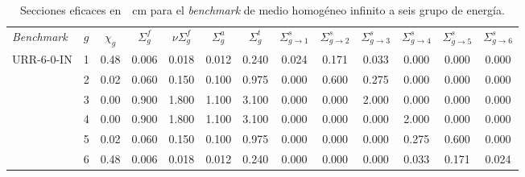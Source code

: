 \documentclass[11pt]{article}
\numberwithin{equation}{section}
\begin{document}
{
\begin{table}[h!]
\begin{center}
\begin{tabular}{lcccccccccccc}
\small \emph{Benchmark}  & \small $g$ & \small $\chi_g$ & \small $\Sigma^{f}_g$ & \small $\nu\Sigma^{f}_g$ & \small $\Sigma^{a}_g$ & \small $\Sigma^{t}_g$ & \small $\Sigma^s_{g \rightarrow 1}$ & \small $\Sigma^s_{g \rightarrow 2}$ & \small $\Sigma^s_{g \rightarrow 3}$ & \small $\Sigma^s_{g \rightarrow 4}$ & \small $\Sigma^s_{g \rightarrow 5}$ & \small $\Sigma^s_{g \rightarrow 6}$ \\
\small{URR-6-0-IN} & \tiny \num{1} & \tiny \num{0.48} & \tiny \num{0.006} & \tiny \num{0.018} & \tiny \num{0.012} & \tiny \num{0.240} & \tiny \num{0.024} & \tiny \num{0.171} & \tiny \num{0.033} & \tiny \num{0.000} & \tiny \num{0.000} & \tiny \num{0.000} \\
           & \tiny \num{2} & \tiny \num{0.02} & \tiny \num{0.060} & \tiny \num{0.150} & \tiny \num{0.100} & \tiny \num{0.975} & \tiny \num{0.000} & \tiny \num{0.600} & \tiny \num{0.275} & \tiny \num{0.000} & \tiny \num{0.000} & \tiny \num{0.000} \\
           & \tiny \num{3} & \tiny \num{0.00} & \tiny \num{0.900} & \tiny \num{1.800} & \tiny \num{1.100} & \tiny \num{3.100} & \tiny \num{0.000} & \tiny \num{0.000} & \tiny \num{2.000} & \tiny \num{0.000} & \tiny \num{0.000} & \tiny \num{0.000} \\
           & \tiny \num{4} & \tiny \num{0.00} & \tiny \num{0.900} & \tiny \num{1.800} & \tiny \num{1.100} & \tiny \num{3.100} & \tiny \num{0.000} & \tiny \num{0.000} & \tiny \num{0.000} & \tiny \num{2.000} & \tiny \num{0.000} & \tiny \num{0.000} \\
           & \tiny \num{5} & \tiny \num{0.02} & \tiny \num{0.060} & \tiny \num{0.150} & \tiny \num{0.100} & \tiny \num{0.975} & \tiny \num{0.000} & \tiny \num{0.000} & \tiny \num{0.000} & \tiny \num{0.275} & \tiny \num{0.600} & \tiny \num{0.000} \\
           & \tiny \num{6} & \tiny \num{0.48} & \tiny \num{0.006} & \tiny \num{0.018} & \tiny \num{0.012} & \tiny \num{0.240} & \tiny \num{0.000} & \tiny \num{0.000} & \tiny \num{0.000} & \tiny \num{0.033} & \tiny \num{0.171} & \tiny \num{0.024} 
\end{tabular}
\caption{\label{tabla:xs-urr} Secciones eficaces en~\si{\per\centi\metre} para el \emph{benchmark} de medio homogéneo infinito a seis grupo de energía.}
\end{center}
\end{table}
}
\end{document}
